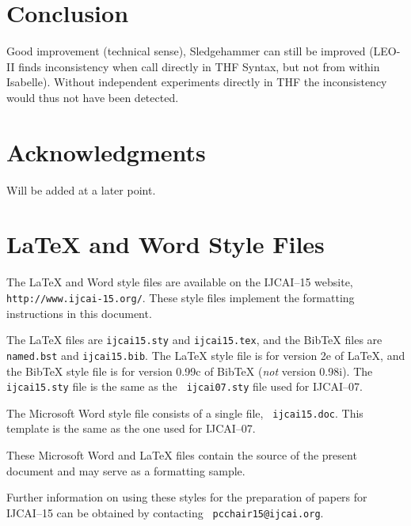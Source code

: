 \documentclass{article}
\begin{document}
\section{Conclusion}


Good improvement (technical sense), Sledgehammer can still be improved
(LEO-II finds inconsistency when call directly in THF Syntax, but not
from within Isabelle). Without independent experiments directly in THF 
the inconsistency would thus not have been detected.

\section*{Acknowledgments}

Will be added at a later point.


\appendix

\section{\LaTeX{} and Word Style Files}\label{stylefiles}

The \LaTeX{} and Word style files are available on the IJCAI--15
website, {\tt http://www.ijcai-15.org/}.
These style files implement the formatting instructions in this
document.

The \LaTeX{} files are {\tt ijcai15.sty} and {\tt ijcai15.tex}, and
the Bib\TeX{} files are {\tt named.bst} and {\tt ijcai15.bib}. The
\LaTeX{} style file is for version 2e of \LaTeX{}, and the Bib\TeX{}
style file is for version 0.99c of Bib\TeX{} ({\em not} version
0.98i). The {\tt ijcai15.sty} file is the same as the {\tt
ijcai07.sty} file used for IJCAI--07.

The Microsoft Word style file consists of a single file, {\tt
ijcai15.doc}. This template is the same as the one used for
IJCAI--07.

These Microsoft Word and \LaTeX{} files contain the source of the
present document and may serve as a formatting sample.  

Further information on using these styles for the preparation of
papers for IJCAI--15 can be obtained by contacting {\tt
pcchair15@ijcai.org}.



\end{document}
